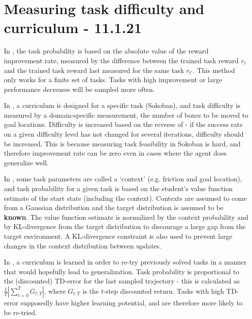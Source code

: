 \documentclass[letterpaper]{article}
\theoremstyle{definition}
\begin{document}
\section{Measuring task difficulty and curriculum - 11.1.21} \label{sec:difficulty}

In \cite{Matiisen2020}, the task probability is based on the absolute value of the reward improvement rate, measured by the difference between the trained task reward $r_t$ and the trained task reward last measured for the same task $r_{t'}$.
This method only works for a finite set of tasks. Tasks with high improvement or large performance decreases will be sampled more often.

In \cite{Feng2020}, a curriculum is designed for a specific task (Sokoban), and task difficulty is measured by a domain-specific measurement, the number of boxes to be moved to goal locations. Difficulty is increased based on the reverse of \cite{Matiisen2020} - if the success rate on a given difficulty level has not changed for several iterations, difficulty should be increased. This is because measuring task feasibility in Sokoban is hard, and therefore improvement rate can be zero even in cases where the agent does generalize well.

In \cite{Klink2020}, some task parameters are called a `context' (e.g. friction and goal location), and task probability for a given task is based on the student's value function estimate of the start state (including the context).
Contexts are assumed to come from a Gaussian distribution and the target distribution is assumed to be \textbf{known}.
The value function estimate is normalized by the context probability and by KL-divergence from the target distribution to discourage a large gap from the target environment. A KL-divergence constraint is also used to prevent large changes in the context distribution between updates.

In \cite{Jiang2020}, a curriculum is learned in order to re-try previously solved tasks in a manner that would hopefully lead to generalization. Task probability is proportional to the (discounted) TD-error for the last sampled trajectory - this is calculated as $ \frac{1}{T} | \sum_{t=0}^{T} {G_{t:T}}|$, where $G_{t:T}$ is the $t$-step discounted return. Tasks with high TD-error supposedly have higher learning potential, and are therefore more likely to be re-tried. 
\end{document}
